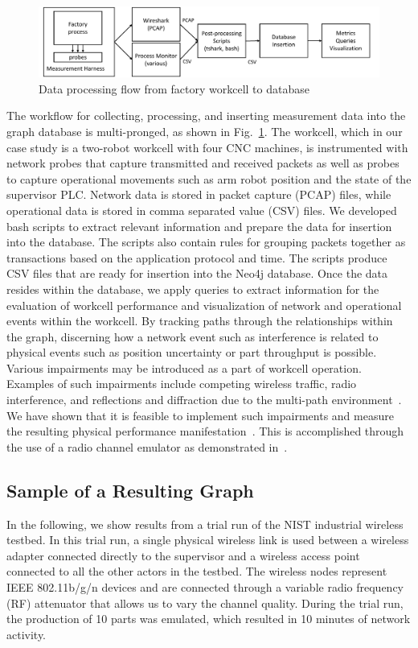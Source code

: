 \begin{figure}[h!]
    \centering
    \includegraphics[width=\textwidth]{./chapter-gdb-appl/figures/database/work-flow.pdf}
    \caption{Data processing flow from factory workcell to database}
    \label{gdbappl:fig::work-flow}
\end{figure}

The workflow for collecting, processing, and inserting measurement data into the graph database is multi-pronged, as shown in Fig.~\ref{gdbappl:fig::work-flow}.  The workcell, which in our case study is a two-robot workcell with four CNC machines, is instrumented with network probes that capture transmitted and received packets as well as probes to capture operational movements such as arm robot position and the state of the supervisor PLC.  Network data is stored in packet capture (PCAP) files, while operational data is stored in comma separated value (CSV) files. We developed bash scripts to extract relevant information and prepare the data for insertion into the database. The scripts also contain rules for grouping packets together as transactions based on the application protocol and time. The scripts produce CSV files that are ready for insertion into the Neo4j database.  Once the data resides within the database, we apply queries to extract information for the evaluation of workcell performance and visualization of network and operational events within the workcell. By tracking paths through the relationships within the graph, discerning how a network event such as interference is related to physical events such as position uncertainty or part throughput is possible. Various impairments may be introduced as a part of workcell operation.  Examples of such impairments include competing wireless traffic, radio interference, and reflections and diffraction due to the multi-path environment~\cite{Candell2017.NIST1951}. We have shown that it is feasible to implement such impairments and measure the resulting physical performance manifestation~\cite{Liu2019vancouver}. This is accomplished through the use of a radio channel emulator as demonstrated in~\cite{Candell2019vancouver}.

\subsection{Sample of a Resulting Graph}
In the following, we show results from a trial run of the NIST industrial wireless testbed. In this trial run, a single physical wireless link is used between a wireless adapter connected directly to the supervisor and a wireless access point connected to all the other actors in the testbed. The wireless nodes represent IEEE 802.11b/g/n devices and are connected through a variable radio frequency (RF) attenuator that allows us to vary the channel quality. During the trial run, the production of 10 parts was emulated, which resulted in 10 minutes of network activity.       

